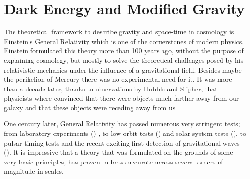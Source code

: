 
\chapter{Dark Energy and Modified Gravity \label{chap:DE-MG-Overview}} %



\newcommand{\keyword}[1]{\textbf{#1}}
\newcommand{\tabhead}[1]{\textbf{#1}}
\newcommand{\code}[1]{\texttt{#1}}
\newcommand{\file}[1]{\texttt{\bfseries#1}}
\newcommand{\option}[1]{\texttt{\itshape#1}}

%

The theoretical framework to describe gravity and space-time in cosmology is Einstein's General Relativity which is
one of the cornerstones of modern physics.
Einstein formulated this theory more than 100 years ago, without the purpose
of explaining cosmology, but mostly to solve the theoretical challenges posed by his relativistic mechanics under the influence of a gravitational field. Besides maybe the
perihelion of Mercury there was no experimental need for it. It was more than a decade later, thanks to observations
by Hubble and Slipher, that physicists where convinced that there were objects much farther away from
our galaxy and that these objects were receding away from us.


One century later, General Relativity has passed numerous very stringent tests; from laboratory experiments (\cite{cite}) , to
low orbit tests (\cite{cite}) and solar system tests (\cite{cite}), to pulsar timing tests and the recent
exciting first detection of gravitational waves (\cite{cite}).
It is impressive that a theory that was formulated on the grounds of some very basic
principles, has proven to be so accurate across several orders of magnitude in scales.

